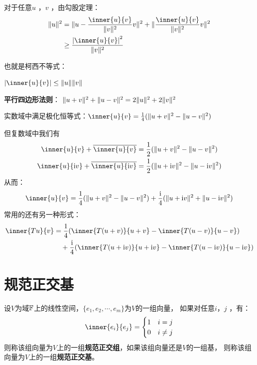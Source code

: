 对于任意\(u\) ，\(v\) ，由勾股定理：
\begin{align*}
    \norm{u}^{2} &= \norm{u - \frac{\inner{u}{v}}{\norm{v}^{2}} v}^{2} +
    \norm{\frac{\inner{u}{v}}{\norm{v}^{2}} v}^{2} \\
    &\geq \frac{\abs{\inner{u}{v}}^{2}}{\norm{v}^{2}}
\end{align*}

也就是柯西不等式：
\begin{theorem}[柯西不等式]
    \(\abs{\inner{u}{v}} \leq \norm{u} \norm{v}\)
\end{theorem}

\begin{corollary}
    \textbf{平行四边形法则}： \(\lVert u + v\rVert^{2} + \lVert u - v\rVert^{2} = 2\lVert u\rVert^{2} +
    2\lVert v\rVert^{2}\)

    实数域中满足极化恒等式：\(\inner{u}{v} = \frac{1}{4}(\norm{u+v}^{2} -
    \norm{u-v}^{2})\)

    但复数域中我们有
    \begin{align*}
        \inner{u}{v} + \conj{\inner{u}{v}} &= \frac{1}{2}(\norm{u+v}^{2} -
        \norm{u-v}^{2}) \\
        \inner{u}{\i v} + \conj{\inner{u}{\i v}} &=
        \frac{1}{2}(\norm{u+\i v}^{2} -
        \norm{u-\i v}^{2})
    \end{align*}
    从而：
    \[
        \inner{u}{v} = \frac{1}{4}(\norm{u+v}^{2} - \norm{u-v}^{2}) +
        \frac{\i}{4}(\norm{u+\i v}^{2} + \norm{u-\i v}^{2})
    \]
    常用的还有另一种形式：
    \begin{align*}
        \inner{Tu}{v} &= \frac{1}{4}(\inner{T(u+v)}{u+v} -
        \inner{T(u-v)}{u-v}) \\
        &\quad + \frac{\i}{4}(\inner{T(u+\i v)}{u+\i v} -
        \inner{T(u-\i v)}{u-\i v})
    \end{align*}
\end{corollary}

\section{规范正交基}

\begin{definition}[规范正交组与规范正交基]
    设\(V\)为域\(\mathbb{F}\)上的线性空间，\(\{e_1, e_2, \cdots, e_m\}\)为\(V\)的一组向量，
    如果对任意\(i\)，\(j\) ，有：
    \[
        \inner{e_i}{e_j} =
        \begin{cases}
            1 & i = j \\
            0 & i \neq j
        \end{cases}
    \]
    则称该组向量为\(V\)上的一组\textbf{规范正交组}，如果该组向量还是\(V\)的一组基，
    则称该组向量为\(V\)上的一组\textbf{规范正交基}。
\end{definition}

